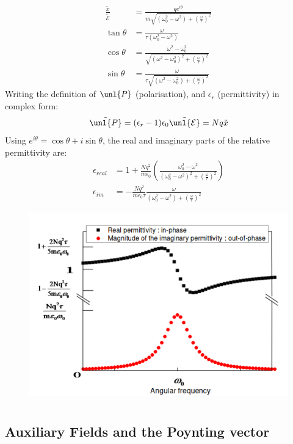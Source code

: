 \documentclass[a4paper, 11pt, normalem]{report}
\newcommand\E{\mathcal{E}}
\newcommand\uE{\unl{\E}}
\newcommand\eno{\epsilon_0}
\newcommand\om{\omega}
\newcommand\er{\epsilon_r}
\newcommand\e{\epsilon}
\newcommand\tx{\tilde{x}}
\begin{document}
\begin{align}
	\frac{\tx}{\tilde{\E}} &= \frac{qe^{i\theta}}{m\sqrt{(\om_0^2 - \om^2) + \left(\frac{\om}{\tau}\right)^2}} \\
	\tan\theta &= \frac{\om}{\tau(\om_0^2 - \om^2)} \\
	\cos\theta &= \frac{\om^2 - \om_0^2}{\sqrt{(\om^2 - \om_0^2)^2 + \left(\frac{\om}{\tau}\right)^2}} \\
	\sin\theta &= \frac{\om}{\tau\sqrt{(\om^2 - \om_0^2) + \left(\frac{\om}{\tau}\right)^2}}
\end{align}
Writing the definition of $\unl{P}$ (polarisation), and $\er$ (permittivity) in complex form:
\begin{equation}
	\tilde{\unl{P}} = (\er - 1)\eno\tilde{\uE} = Nq\tx
\end{equation}
Using $e^{i\theta} = \cos\theta + i\sin\theta$, the real and imaginary parts of the relative permittivity are:
\begin{align}
	\e_{real} &= 1 + \frac{Nq^2}{m\eno}\left(\frac{\om_0^2 - \om^2}{(\om_0^2 - \om^2)^2 + \left(\frac{\om}{\tau}\right)^2}\right) \\
	\e_{im} &= -\frac{Nq^2}{m\eno\tau}\frac{\om}{(\om_0^2 - \om^2) + \left(\frac{\om}{\tau}\right)^2}
\end{align}
\begin{figure}[H]
	\centering
	\includegraphics[scale=0.4]{angfreq.png}
\end{figure}

\chapter{}
\section{Auxiliary Fields and the Poynting vector}
\end{document}
